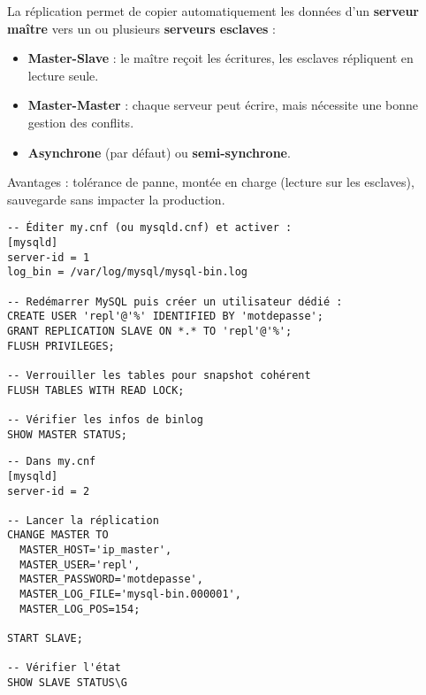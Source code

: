 \documentclass[a4paper,11pt]{article}
\begin{document}
\begin{tcolorbox}[colback=blue!5!white,colframe=blue!75!black,title=Principe de la réplication MySQL]
La réplication permet de copier automatiquement les données d’un \textbf{serveur maître} vers un ou plusieurs \textbf{serveurs esclaves} :
\begin{itemize}
  \item \textbf{Master-Slave} : le maître reçoit les écritures, les esclaves répliquent en lecture seule.
  \item \textbf{Master-Master} : chaque serveur peut écrire, mais nécessite une bonne gestion des conflits.
  \item \textbf{Asynchrone} (par défaut) ou \textbf{semi-synchrone}.
\end{itemize}
Avantages : tolérance de panne, montée en charge (lecture sur les esclaves), sauvegarde sans impacter la production.
\end{tcolorbox}

\begin{tcolorbox}[colback=green!5!white,colframe=green!75!black,title=Configuration côté maître]
\begin{verbatim}
-- Éditer my.cnf (ou mysqld.cnf) et activer :
[mysqld]
server-id = 1
log_bin = /var/log/mysql/mysql-bin.log

-- Redémarrer MySQL puis créer un utilisateur dédié :
CREATE USER 'repl'@'%' IDENTIFIED BY 'motdepasse';
GRANT REPLICATION SLAVE ON *.* TO 'repl'@'%';
FLUSH PRIVILEGES;

-- Verrouiller les tables pour snapshot cohérent
FLUSH TABLES WITH READ LOCK;

-- Vérifier les infos de binlog
SHOW MASTER STATUS;
\end{verbatim}
\end{tcolorbox}

\begin{tcolorbox}[colback=yellow!5!white,colframe=yellow!75!black,title=Configuration côté esclave]
\begin{verbatim}
-- Dans my.cnf
[mysqld]
server-id = 2

-- Lancer la réplication
CHANGE MASTER TO
  MASTER_HOST='ip_master',
  MASTER_USER='repl',
  MASTER_PASSWORD='motdepasse',
  MASTER_LOG_FILE='mysql-bin.000001',
  MASTER_LOG_POS=154;

START SLAVE;

-- Vérifier l'état
SHOW SLAVE STATUS\G
\end{verbatim}
\end{tcolorbox}
\end{document}
